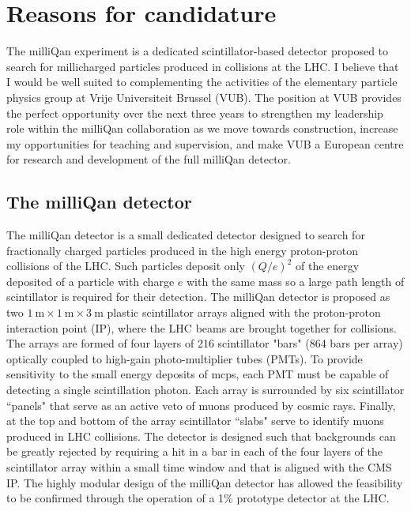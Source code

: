 \documentclass[11pt]{article}
\theoremstyle{plain} \numberwithin{equation}{section}
\theoremstyle{definition}
\begin{document}
\section*{Reasons for candidature}
\noindent 

The milliQan experiment is a dedicated scintillator-based detector
proposed to search for millicharged particles produced in collisions
at the LHC. I believe that I would be well suited to complementing the activities of the 
elementary particle physics group at Vrije Universiteit Brussel (VUB). 
The position at VUB provides the perfect opportunity over the next three years 
to strengthen my leadership role within the milliQan collaboration as we move towards construction, 
increase my opportunities for teaching and supervision, and make VUB a European centre
for research and development of the full milliQan detector.

\subsection*{The milliQan detector}

The milliQan detector is a small dedicated detector 
designed to search for fractionally 
charged particles produced in the high energy proton-proton collisions of the LHC. 
Such particles deposit only $(Q/e)^2$ of the energy 
deposited of a particle with charge $e$ with
the same mass so a large path length of scintillator is required for
their detection. The milliQan detector is proposed as two 
$1~\mathrm{m}\times1~\mathrm{m}\times3~\mathrm{m}$ plastic scintillator arrays aligned 
with the proton-proton interaction point (IP), where the LHC beams are brought together
for collisions. The arrays are formed of four layers of 216 scintillator "bars" 
(864 bars per array) optically coupled to high-gain photo-multiplier tubes (PMTs). 
To provide sensitivity to the small energy deposits of mcps, each PMT must be 
capable of detecting a single scintillation photon. Each array is surrounded by six 
scintillator ``panels" that serve as an active veto of muons produced 
by cosmic rays. Finally, at the top and bottom of the array
scintillator ``slabs" serve to identify muons produced in LHC collisions. 
The detector is designed such that backgrounds can be greatly rejected 
by requiring a hit in a bar in each of the four layers 
of the scintillator array within a small time 
window and that is aligned with the CMS IP. The highly modular design of the milliQan detector 
has allowed the feasibility to be confirmed through the operation 
of a 1\% prototype detector at the LHC.
\end{document}
